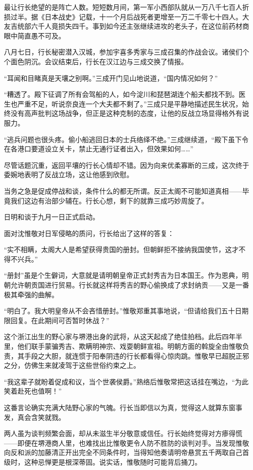 \documentclass[
]{article}
\begin{document}
最让行长绝望的是阵亡人数。短短数月间，第一军小西部队就从一万八千七百人折损过半。据《日本战史》记载，十一个月后战死者更增至一万二千零七十四人。大友吉统部六千人竟损失四千。事到如今还主张继续进攻的老头子，在这位前药材商眼中简直愚不可及。

八月七日，行长秘密潜入汉城，参加宇喜多秀家与三成召集的作战会议。诸侯们个个面色阴沉。会议结束后，行长在汉江边与三成交换了情报。

``耳闻和目睹真是天壤之别啊。''三成开门见山地说道，``国内情况如何？''

``糟透了。殿下征调了所有会驾船的人，如今淀川和琵琶湖连个船夫都找不到。医生也严重不足，听说奈良连一个大夫都不剩了。''三成只是平静地描述民生状况，始终没有高声批判这场战争，但正是这种克制的态度，让他的反战立场显得格外有说服力。

``逃兵问题也很头疼。偷小船逃回日本的士兵络绎不绝。''三成继续道，``殿下虽下令在各港口要道设立关卡，禁止无通行证者出入，但效果如何\ldots\ldots{}''

尽管话题沉重，返回平壤的行长心情却不错。因为向来优柔寡断的三成，这次终于委婉地表明了反战立场，这让他感到欣慰。

当务之急是促成停战和谈，条件什么的都无所谓。反正太阁不可能知道真相------毕竟我们这边有治部少辅在。行长心想，剩下的就靠三成巧妙周旋了。

日明和谈于九月一日正式启动。

面对沈惟敬对日军侵略的质问，行长给出了这样的答复：

``实不相瞒，太阁大人是希望获得贵国的册封。但朝鲜拒不接纳我国使节，这才不得不兴兵。''

``册封''虽是个生僻词，大意就是请明朝皇帝正式封秀吉为日本国王。作为恩典，明朝允许朝贡国进行贸易。行长就这样将秀吉的野心偷换成了求封纳贡------又是一番极其牵强的曲解。

``明白了。我大明皇帝从不会吝惜册封。''惟敬郑重其事地说，``但请给我们五十日期限回复。在此期间可否暂时休战？''

这个浙江出生的野心家与堺港出身的武将，从这天起成了绝佳拍档。此后四年半里，他们联手蒙骗秀吉、欺瞒明神宗、戏耍朝鲜宣祖。明朝方面的斡旋全由惟敬负责，其手段之大胆，就连惯于阳奉阴违的行长都看得心惊肉跳。惟敬早已超脱正邪之分，仿佛生来就凌驾于这些世俗约束之上。

``我这辈子就盼着促成和议，当个世袭侯爵。''熟络后惟敬常把这话挂在嘴边，``为此笑着赴死也值啊！''

这番言论确实充满大陆野心家的气魄。行长当即信以为真，觉得这人就算东窗事发，真会含笑就戮。

两人虽为谈判频繁会面，却从未滋生半分敬意或信任。行长始终觉得对方瘆得慌------即便在堺港商人里，也难找出比惟敬更令人防不胜防的谈判对手。当发现惟敬向反和派的加藤清正开出完全不同条件时，当得知他奏请明帝悬赏五千两取自己首级时，这种忌惮更是根深蒂固。说实话，惟敬随时可能背后捅刀。
\end{document}

